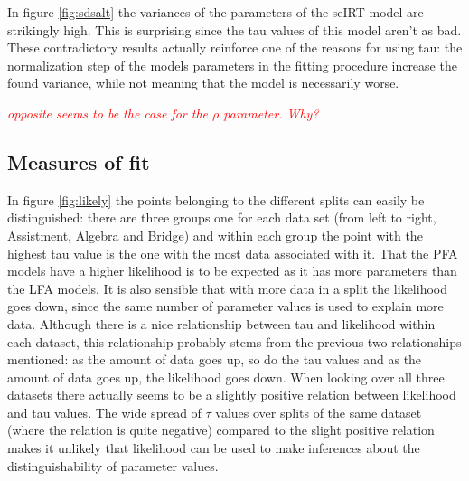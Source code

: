 \documentclass{scrartcl}
\newcommand\todo[1]{\textit{\textcolor{red}{#1}}}
\begin{document}
In figure \ref{fig:sdsalt} the variances of the parameters of the seIRT model are strikingly high. This is surprising since the tau values of this model aren't as bad. These contradictory results actually reinforce one of the reasons for using tau: the normalization step of the models parameters in the fitting procedure increase the found variance, while not meaning that the model is necessarily worse.

\todo{opposite seems to be the case for the $\rho$ parameter. Why?}

\subsection{Measures of fit}
In figure \ref{fig:likely} the points belonging to the different splits can easily be distinguished: there are three groups one for each data set (from left to right, Assistment, Algebra and Bridge) and within each group the point with the highest tau value is the one with the most data associated with it. That the PFA models have a higher likelihood is to be expected as it has more parameters than the LFA models. It is also sensible that with more data in a split the likelihood goes down, since the same number of parameter values is used to explain more data. Although there is a nice relationship between tau and likelihood within each dataset, this relationship probably stems from the previous two relationships mentioned: as the amount of data goes up, so do the tau values and as the amount of data goes up, the likelihood goes down. When looking over all three datasets there actually seems to be a slightly positive relation between likelihood and tau values. The wide spread of $\tau$ values over splits of the same dataset (where the relation is quite negative) compared to the slight positive relation makes it unlikely that likelihood can be used to make inferences about the distinguishability of parameter values.   
\end{document}
